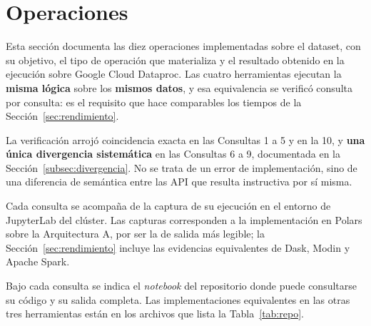 \section{Operaciones}
\label{sec:operaciones}

Esta sección documenta las diez operaciones implementadas sobre el dataset, con su objetivo, el tipo de operación que materializa y el resultado obtenido en la ejecución sobre Google Cloud Dataproc. Las cuatro herramientas ejecutan la \textbf{misma lógica} sobre los \textbf{mismos datos}, y esa equivalencia se verificó consulta por consulta: es el requisito que hace comparables los tiempos de la Sección~\ref{sec:rendimiento}.

La verificación arrojó coincidencia exacta en las Consultas 1 a 5 y en la 10, y \textbf{una única divergencia sistemática} en las Consultas 6 a 9, documentada en la Sección~\ref{subsec:divergencia}. No se trata de un error de implementación, sino de una diferencia de semántica entre las API que resulta instructiva por sí misma.

Cada consulta se acompaña de la captura de su ejecución en el entorno de JupyterLab del clúster. Las capturas corresponden a la implementación en Polars sobre la Arquitectura A, por ser la de salida más legible; la Sección~\ref{sec:rendimiento} incluye las evidencias equivalentes de Dask, Modin y Apache Spark.

Bajo cada consulta se indica el \textit{notebook} del repositorio donde puede consultarse su código y su salida completa. Las implementaciones equivalentes en las otras tres herramientas están en los archivos que lista la Tabla~\ref{tab:repo}.

